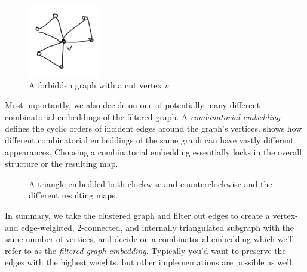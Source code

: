 \begin{figure}[H]
	\centering\includegraphics[height=120px]{Resources/Filtering-Connectedness.png}
	\caption{A forbidden graph with a cut vertex $v$.}
	\label{fig:filtering-connectedness}
\end{figure}

Most importantly, we also decide on one of potentially many different combinatorial embeddings of the filtered graph. A \emph{combinatorial embedding} defines the cyclic orders of incident edges around the graph's vertices.  shows how different combinatorial embeddings of the same graph can have vastly different appearances. Choosing a  combinatorial embedding essentially locks in the overall structure or the resulting map.

\begin{figure}[H]
	\centering
	\caption{A triangle embedded both clockwise and counterclockwise and the different resulting maps.}
	\label{fig:filtering-embedding}
\end{figure}

In summary, we take the clustered graph and filter out edges to create a vertex- and edge-weighted, 2-connected, and internally triangulated subgraph with the same number of vertices, and decide on a combinatorial embedding which we'll refer to as the \emph{filtered graph embedding}. Typically you'd want to preserve the edges with the highest weights, but other implementations are possible as well.


